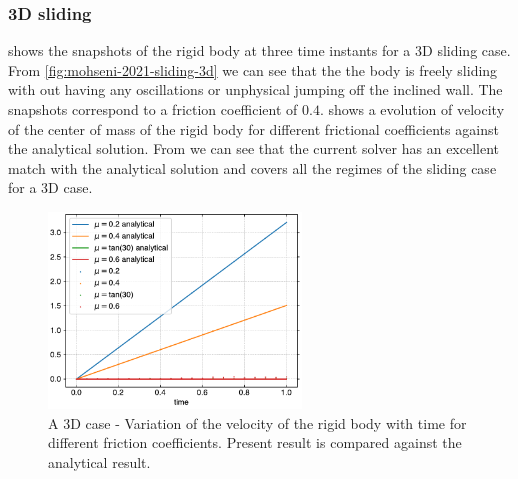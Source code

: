 \subsubsection{3D sliding}
\label{sec:results-3d-sliding}

 shows the snapshots of the rigid body at
three time instants for a 3D sliding case. From
\cref{fig:mohseni-2021-sliding-3d} we can see that the the body is freely
sliding with out having any oscillations or unphysical jumping off the inclined
wall. The snapshots correspond to a friction coefficient of $0.4$.
 shows a evolution of
velocity of the center of mass of the rigid body for different frictional
coefficients against the analytical solution. From
 we can see that the current
solver has an excellent match with the analytical solution and covers all the
regimes of the sliding case for a 3D case.
\begin{figure}[!htpb]
  \centering
  \includegraphics[width=0.6\textwidth]{figures/rfc/figures/mohseni_2021_free_sliding_on_a_slope_3d/velocity_vs_time}
  \caption{A 3D case - Variation of the velocity of the rigid body with time for different
    friction coefficients. Present result is compared against the analytical
    result.}
\label{fig:results-solid-sliding-velocity-vs-time-3d}
\end{figure}

